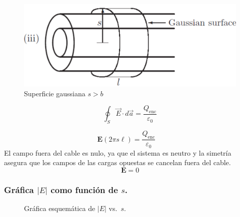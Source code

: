 \documentclass[12pt]{article}
\def\a{3}      %
\def\Emax{4}   %
\def\b{8}      %
\begin{document}
\begin{figure}[ht]
    \centering
    \includegraphics[width=0.75\linewidth]{imagenes/(iii).png}
    \caption*{Superficie gaussiana \(  s > b \)}
    \label{fig:enter-label}
\end{figure}

\[
\oint_S \vec{E} \cdot d\vec{a} = \frac{Q_{\text{enc}}}{\varepsilon_0}
\]

\[
\textbf{E} (2\pi s \ell) = \frac{Q_{\text{enc}}}{\varepsilon_0}\quad
\]
El campo fuera del cable es nulo, ya que el sistema es neutro y la simetría asegura que los campos de las cargas opuestas se cancelan fuera del cable.
\[
\boxed{\textbf{E} = 0}
\]

\subsubsection*{Gráfica \( |E| \) como función de \( s \).}

\begin{figure}[H]
  \centering
  \caption{Gráfica esquemática de \(|E|\) vs.\ \(s\).}
  \label{fig:EvsS}
\end{figure}
\end{document}

